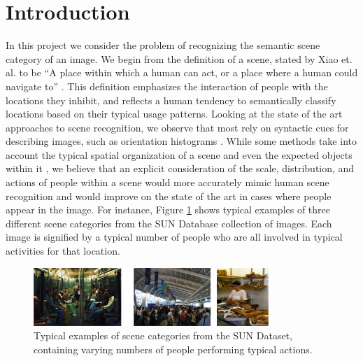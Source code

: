 \documentclass[11pt]{article}
\begin{document}
\section{Introduction}
In this project we consider the problem of recognizing the semantic scene category of an image. We begin from the definition of a scene, stated by Xiao et. al. to be ``A place within which a human can act, or a place where a human could navigate to'' \cite{SUN}. This definition emphasizes the interaction of people with the locations they inhibit, and reflects a human tendency to semantically classify locations based on their typical usage patterns. Looking at the state of the art approaches to scene recognition, we observe that most rely on syntactic cues for describing images, such as orientation histograms \cite{gist}. While some methods take into account the typical spatial organization of a scene \cite{beyond_bags} and even the expected objects within it \cite{object_bank}, we believe that an explicit consideration of the scale, distribution, and actions of people within a scene would more accurately mimic human scene recognition and would improve on the state of the art in cases where people appear in the image. For instance, Figure \ref{fig:people} shows typical examples of three different scene categories from the SUN Database collection of images. Each image is signified by a typical number of people who are all involved in typical activities for that location.

\begin{figure}[h]
 \centering
\includegraphics[width=3.5in]{images/people.png}
 \caption{Typical examples of scene categories from the SUN Dataset, containing varying numbers of people performing typical actions.}
 \label{fig:people}
\end{figure}


\end{document}
